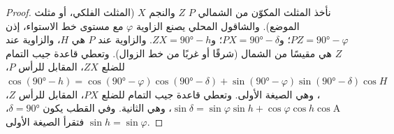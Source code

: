 \begin{proof}
نأخذ المثلث المكوّن من  الشمالي $P$  $Z$ والنجم $X$ (المثلث الفلكي، أو مثلث الموضع). والشاقول المحلي يصنع الزاوية $\varphi$ مع مستوى خط الاستواء، إذن $PZ =
\ang{90} - \varphi$؛ و$PX = \ang{90} - \delta$؛ و$ZX = \ang{90} - h$. والزاوية عند $P$ هي  $H$، والزاوية عند $Z$ هي  مقيسًا من الشمال (شرقًا أو غربًا من خط الزوال). وتعطي قاعدة جيب التمام للضلع $ZX$، المقابل للرأس $P$،
$\cos(\ang{90} - h) = \cos(\ang{90} - \varphi)\cos(\ang{90} - \delta) +
\sin(\ang{90} - \varphi)\sin(\ang{90} - \delta)\cos H$، وهي الصيغة الأولى. وتعطي قاعدة جيب التمام للضلع $PX$، المقابل للرأس $Z$،
$\sin\delta = \sin\varphi\sin h + \cos\varphi\cos h\cos\mathrm{A}$، وهي الثانية. وفي القطب يكون $\delta = \ang{90}$، فتقرأ الصيغة الأولى $\sin h = \sin\varphi$.
\end{proof}

